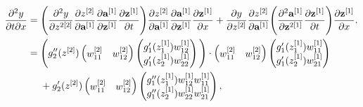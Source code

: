 \documentclass{article}
\begin{document}
\begin{align}
\frac{\partial^2 y}{\partial t \partial x} &= \Bigg{(} \frac{\partial^2 y}{\partial z^{2{[2]}}} \frac{\partial z^{[2]}}{\partial \textbf{a}^{[1]}} \frac{\partial \textbf{a}^{[1]}}{\partial \textbf{z}^{[1]}} \frac{\partial \textbf{z}^{[1]}}{\partial t} \Bigg{)} \frac{\partial z^{[2]}}{\partial \textbf{a}^{[1]}} \frac{\partial \textbf{a}^{[1]}}{\partial \textbf{z}^{[1]}}  \frac{\partial \textbf{z}^{[1]}}{\partial x} + 
\frac{\partial y}{\partial z^{[2]}} \frac{\partial z^{[2]}}{\partial \textbf{a}^{[1]}} \Bigg{(} \frac{\partial^2 \textbf{a}^{[1]}}{\partial \textbf{z}^{2{[1]}}}  \frac{\partial \textbf{z}^{[1]}}{\partial t} \Bigg{)}  \frac{\partial \textbf{z}^{[1]}}{\partial x}. \\
&=\Bigg{(} g_2''(z^{[2]}) 
\begin{pmatrix}
w_{11}^{[2]} & w_{12}^{[2]} 
\end{pmatrix}
\begin{pmatrix}
g_1'(z_1^{[1]}) w_{12}^{[1]} \\
g_1'(z_2^{[1]}) w_{22}^{[1]}
\end{pmatrix}
\Bigg{)}\cdot 
\begin{pmatrix}
w_{11}^{[2]} & w_{12}^{[2]} 
\end{pmatrix}
\begin{pmatrix}
g_1'(z_1^{[1]}) w_{11}^{[1]} \\
g_1'(z_2^{[1]}) w_{21}^{[1]}
\end{pmatrix}
\\
&~~~~ +g_2'(z^{[2]})
\begin{pmatrix}
w_{11}^{[2]} & w_{12}^{[2]} 
\end{pmatrix}
\begin{pmatrix}
g_1''(z_1^{[1]}) w_{12}^{[1]} w_{11}^{[1]}  \\
g_1''(z_2^{[1]}) w_{22}^{[1]} w_{21}^{[1]}  \\
\end{pmatrix},
\label{dy2dtdxlongmat} 
\end{align}
\end{document}
